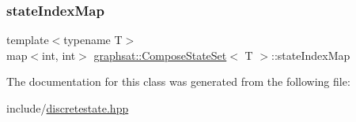 \mbox{\label{classgraphsat_1_1_compose_state_set_abf29da88a54ef280473d506130ef6bc3}} 
\subsubsection{\texorpdfstring{stateIndexMap}{stateIndexMap}}
{\footnotesize\ttfamily template$<$typename T$>$ \\
map$<$int, int$>$ \mbox{\hyperlink{classgraphsat_1_1_compose_state_set}{graphsat\+::\+Compose\+State\+Set}}$<$ T $>$\+::state\+Index\+Map\hspace{0.3cm}{\ttfamily [protected]}}



The documentation for this class was generated from the following file\+:\begin{DoxyCompactItemize}
\item 
include/\mbox{\hyperlink{discretestate_8hpp}{discretestate.\+hpp}}\end{DoxyCompactItemize}
